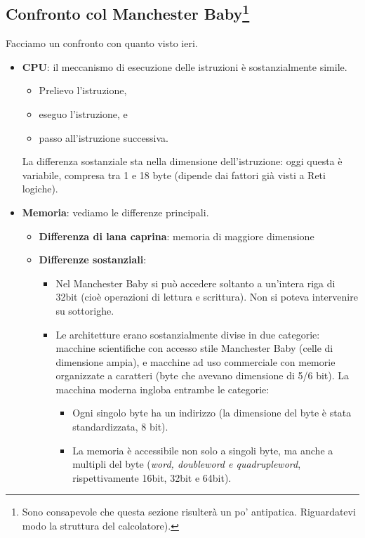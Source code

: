\subsection[{Confronto col Manchester Baby}]{Confronto col Manchester Baby\footnote{Sono consapevole che questa sezione risulterà un po' antipatica. Riguardatevi modo la struttura del calcolatore). }} Facciamo un confronto con quanto visto ieri.
\begin{itemize}
	\item \textbf{CPU}: il meccanismo di esecuzione delle istruzioni è sostanzialmente simile.
	\begin{itemize}
		\item Prelievo l'istruzione,
		\item eseguo l'istruzione, e
		\item passo all'istruzione successiva.
	\end{itemize}
	La differenza sostanziale sta nella dimensione dell'istruzione: oggi questa è variabile, compresa tra 1 e 18 byte (dipende dai fattori già visti a Reti logiche).
	\item \textbf{Memoria}: vediamo le differenze principali.
	\begin{itemize}
		\item \textbf{Differenza di lana caprina}: memoria di maggiore dimensione
		\item \textbf{Differenze sostanziali}: 
		\begin{itemize}
			\item Nel Manchester Baby si può accedere soltanto a un'intera riga di 32bit (cioè operazioni di lettura e scrittura). Non si poteva intervenire su sottorighe.
			\item Le architetture erano sostanzialmente divise in due categorie: macchine scientifiche con accesso stile Manchester Baby (celle di dimensione ampia), e macchine ad uso commerciale con memorie organizzate a caratteri (byte che avevano dimensione di 5/6 bit). La macchina moderna ingloba entrambe le categorie:
			\begin{itemize}
				\item Ogni singolo byte ha un indirizzo (la dimensione del byte è stata standardizzata, 8 bit). 
				\item La memoria è accessibile non solo a singoli byte, ma anche a multipli del byte (\emph{word, doubleword e quadrupleword}, rispettivamente 16bit, 32bit e 64bit).
			\end{itemize}
		\end{itemize}
	\end{itemize}

\end{itemize}
